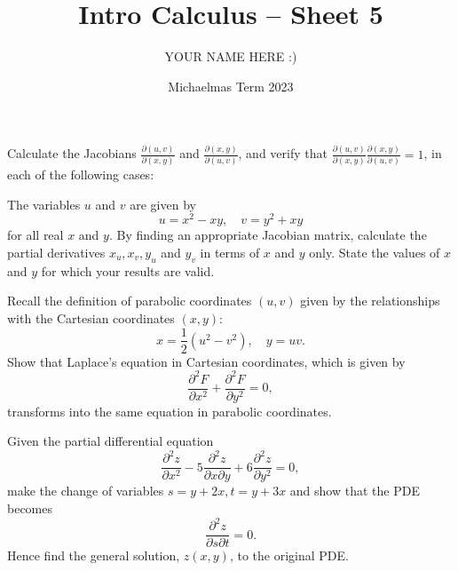\documentclass[answers]{exam}
\title{Intro Calculus -- Sheet 5}
\author{YOUR NAME HERE :)}
\date{Michaelmas Term 2023}
\newcommand*{\bump}{\vspace{1em}\phantom{}\vspace{-1.75em}}
\begin{document}
\maketitle
\begin{questions}

\question%
Calculate the Jacobians $\frac{\partial(u, v)}{\partial(x, y)}$ and $\frac{\partial(x, y)}{\partial(u, v)}$, and verify that $\frac{\partial(u, v)}{\partial(x, y)} \frac{\partial(x, y)}{\partial(u, v)}=1$, in each of the following cases:
\begin{parts}
\part%
\bump \[
	u=x+y, \quad v=\frac yx;
\]

\part%
\bump \[
	u=\frac{x^2}{y},\quad v=\frac{y^{2}}{x}.
\]
\end{parts}



\question%
The variables $u$ and $v$ are given by \[ u=x^{2}-x y, \quad v=y^{2}+x y \] for all real $x$ and $y$. By finding an appropriate Jacobian matrix, calculate the partial derivatives $x_{u}, x_{v}, y_{u}$ and $y_{v}$ in terms of $x$ and $y$ only. State the values of $x$ and $y$ for which your results are valid.



\question%
Recall the definition of parabolic coordinates $(u, v)$ given by the relationships with the Cartesian coordinates $(x, y)$: \[
	x=\frac12(u^2-v^2), \quad y=uv.
\] Show that Laplace's equation in Cartesian coordinates, which is given by \[
	\frac{\partial^2F}{\partial x^2}+\frac{\partial^2F}{\partial y^2}=0,
\] transforms into the same equation in parabolic coordinates.



\question%
Given the partial differential equation \[
	\frac{\partial^2z}{\partial x^2}-5\frac{\partial^2z}{\partial x\partial y}+6\frac{\partial^2z}{\partial y^2}=0,
\] make the change of variables $s=y+2 x, t=y+3 x$ and show that the PDE becomes \[
	\frac{\partial^2z}{\partial s\partial t}=0.
\] Hence find the general solution, $z(x, y)$, to the original PDE.




\end{questions}
\end{document}
